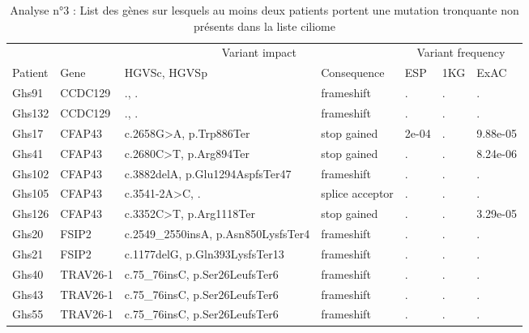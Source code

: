 \documentclass[12pt,twoside]{reedthesis}
\theoremstyle{definition}
\theoremstyle{definition}
\theoremstyle{remark}
\begin{document}
  \begin{landscape}
  \begin{longtable}[t]{lllllll}
  \caption{\label{tab:tabgrp2high}Analyse n°3 : List des gènes sur lesquels au moins deux patients portent une mutation tronquante non présents dans la liste ciliome}\\
  \toprule
  \multicolumn{1}{c}{ } & \multicolumn{1}{c}{ } & \multicolumn{2}{c}{Variant impact} & \multicolumn{3}{c}{Variant frequency} \\
  \cmidrule(l{2pt}r{2pt}){3-4} \cmidrule(l{2pt}r{2pt}){5-7}
  Patient & Gene & HGVSc, HGVSp & Consequence & ESP & 1KG & ExAC\\
  \midrule
  Ghs91 & CCDC129 & ., . & frameshift & . & . & .\\
  Ghs132 & CCDC129 & ., . & frameshift & . & . & .\\
  Ghs17 & CFAP43 & c.2658G>A, p.Trp886Ter & stop gained & 2e-04 & . & 9.88e-05\\
  Ghs41 & CFAP43 & c.2680C>T, p.Arg894Ter & stop gained & . & . & 8.24e-06\\
  Ghs102 & CFAP43 & c.3882delA, p.Glu1294AspfsTer47 & frameshift & . & . & .\\
  \addlinespace
  Ghs105 & CFAP43 & c.3541-2A>C, . & splice acceptor & . & . & .\\
  Ghs126 & CFAP43 & c.3352C>T, p.Arg1118Ter & stop gained & . & . & 3.29e-05\\
  Ghs20 & FSIP2 & c.2549\_2550insA, p.Asn850LysfsTer4 & frameshift & . & . & .\\
  Ghs21 & FSIP2 & c.1177delG, p.Gln393LysfsTer13 & frameshift & . & . & .\\
  Ghs40 & TRAV26-1 & c.75\_76insC, p.Ser26LeufsTer6 & frameshift & . & . & .\\
  \addlinespace
  Ghs43 & TRAV26-1 & c.75\_76insC, p.Ser26LeufsTer6 & frameshift & . & . & .\\
  Ghs55 & TRAV26-1 & c.75\_76insC, p.Ser26LeufsTer6 & frameshift & . & . & .\\
  \bottomrule
  \end{longtable}
  \end{landscape}
  
  \newpage
  
\end{document}
